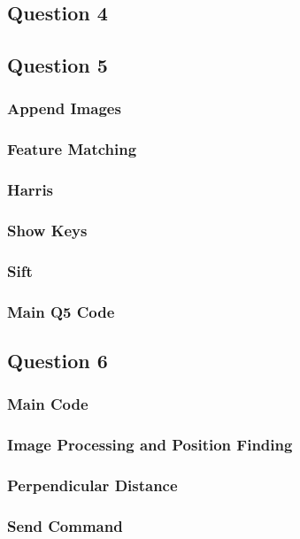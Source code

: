 	\subsection{Question 4}
	\pagebreak
	
	\subsection{Question 5}
		\subsubsection{Append Images}
		
		\pagebreak
		\subsubsection{Feature Matching}
		
		\pagebreak
		\subsubsection{Harris}
		
		\pagebreak
		\subsubsection{Show Keys}
		
		\pagebreak
		\subsubsection{Sift}
		
		\pagebreak
		\subsubsection{Main Q5 Code}
		
		\pagebreak
	
	\subsection{Question 6}
	\subsubsection{Main Code}
	
	\pagebreak
	\subsubsection{Image Processing and Position Finding}
	
	\pagebreak
	\subsubsection{Perpendicular Distance}
	
	\pagebreak
	\subsubsection{Send Command}
	
	
	\pagebreak
		
